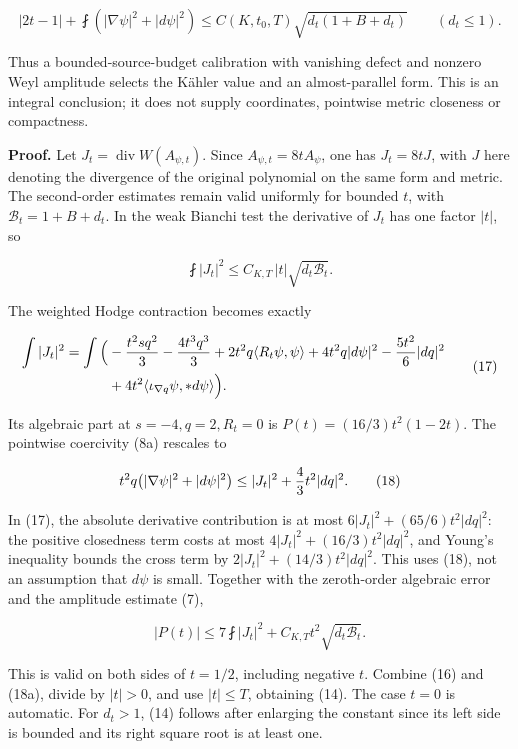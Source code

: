 \documentclass[
  10pt,
]{article}
\begin{document}
\[
 |2t-1|+\fint\left(|\nabla\psi|^2+|d\psi|^2\right)
 \le C(K,t_0,T)\sqrt{d_t(1+B+d_t)}\qquad(d_t\le1).       \tag{15}
\]

Thus a bounded-source-budget calibration with vanishing defect and
nonzero Weyl amplitude selects the Kähler value and an almost-parallel
form. This is an integral conclusion; it does not supply coordinates,
pointwise metric closeness or compactness.

\textbf{Proof.} Let \(J_t=\operatorname{div}W(A_{\psi,t})\). Since
\(A_{\psi,t}=8tA_\psi\), one has \(J_t=8tJ\), with \(J\) here denoting
the divergence of the original polynomial on the same form and metric.
The second-order estimates remain valid uniformly for bounded \(t\),
with \(\mathcal B_t=1+B+d_t\). In the weak Bianchi test the derivative
of \(J_t\) has one factor \(|t|\), so

\[
                  \fint|J_t|^2\le C_{K,T}\,|t|
                                      \sqrt{d_t\mathcal B_t}. \tag{16}
\]

The weighted Hodge contraction becomes exactly

\[
\begin{aligned}
 \int|J_t|^2=\int\Big(&-{t^2s q^2\over3}
       -{4t^3q^3\over3}+2t^2q\langle R_t\psi,\psi\rangle
       +4t^2q|d\psi|^2-{5t^2\over6}|dq|^2\\
       &+4t^2\langle\iota_{\nabla q}\psi,*d\psi\rangle
                    \Big).                               
\end{aligned}\tag{17}
\]

Its algebraic part at \(s=-4,q=2,R_t=0\) is \(P(t)=(16/3)t^2(1-2t)\).
The pointwise coercivity (8a) rescales to

\[
 t^2q\bigl(|\nabla\psi|^2+|d\psi|^2\bigr)
          \le |J_t|^2+{4\over3}t^2|dq|^2.                \tag{18}
\]

In (17), the absolute derivative contribution is at most
\(6|J_t|^2+(65/6)t^2|dq|^2\): the positive closedness term costs at most
\(4|J_t|^2+(16/3)t^2|dq|^2\), and Young's inequality bounds the cross
term by \(2|J_t|^2+(14/3)t^2|dq|^2\). This uses (18), not an assumption
that \(d\psi\) is small. Together with the zeroth-order algebraic error
and the amplitude estimate (7),

\[
 |P(t)|\le 7\fint|J_t|^2+
                  C_{K,T}t^2\sqrt{d_t\mathcal B_t}.       \tag{18a}
\]

This is valid on both sides of \(t=1/2\), including negative \(t\).
Combine (16) and (18a), divide by \(|t|>0\), and use \(|t|\le T\),
obtaining (14). The case \(t=0\) is automatic. For \(d_t>1\), (14)
follows after enlarging the constant since its left side is bounded and
its right square root is at least one.
\end{document}
